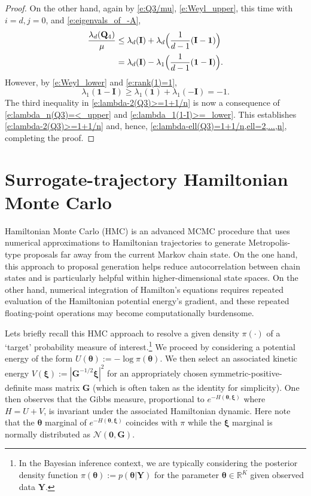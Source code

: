 \documentclass[9pt,twocolumn,twoside]{pnas-new}
\newcommand{\?}{\textbf{?}}
\newcommand{\Y}{\textbf{Y}}
\newcommand{\GD}[1]{#1}
\newcommand{\QQ}{\mathbf{Q}}
\newcommand{\II}{\mathbf{I}}
\newcommand{\Zero}{\boldsymbol{0}}
\newcommand{\ttheta}{\boldsymbol{\theta}}
\newcommand{\mom}{\boldsymbol{\xi}}
\begin{document}
\begin{proof}
On the other hand, again by \eqref{e:Q3/mu}, \eqref{e:Weyl_upper}, this
time with $i = d, j = 0$, and \eqref{e:eigenvals_of_-A},
\begin{align}
  \GD{\frac{\lambda_d(\QQ_4)}{\mu}}
  &\leq \lambda_d(\II)
         + \lambda_d\Big(\frac{1}{d-1}(\II - {\mathbf 1})\Big)
    \notag\\
  &= \lambda_d(\II) - \lambda_1\Big(\frac{1}{d-1}({\mathbf 1}-\II)\Big).
        \label{e:lambda_n(Q3)=<_upper}
\end{align}
However, by \eqref{e:Weyl_lower} and \eqref{e:rank(1)=1},
\begin{equation}\label{e:lambda_1(1-I)>=_lower}
\lambda_1({\mathbf 1}-\II) \geq \lambda_1({\mathbf 1}) + \lambda_1(-\II)= -1.
\end{equation}
The third inequality in \eqref{e:lambda-2(Q3)>=1+1/n} is now a
consequence of \eqref{e:lambda_n(Q3)=<_upper} and
\eqref{e:lambda_1(1-I)>=_lower}. This establishes
\eqref{e:lambda-2(Q3)>=1+1/n} and, hence,
\eqref{e:lambda-ell(Q3)=1+1/n,ell=2,...,n}, completing the proof.
\end{proof}


\section{Surrogate-trajectory Hamiltonian Monte Carlo}
\label{sec:Sur:trad:HMC}

\newcommand{\G}{\mathbf{G}}

Hamiltonian Monte Carlo (HMC) \cite{duane1987hybrid,neal2011mcmc} is
an advanced MCMC procedure that uses numerical approximations to
Hamiltonian trajectories to generate Metropolis-type
\cite{metropolis1953equation} proposals far away from the current
Markov chain state.  On the one hand, this approach to proposal
generation helps reduce autocorrelation between chain states and is
particularly helpful within higher-dimensional state spaces.  On the
other hand, numerical integration of Hamilton's equations requires
repeated evaluation of the Hamiltonian potential energy's gradient,
and these repeated floating-point operations may become
computationally burdensome.

Lets briefly recall this HMC approach to resolve a given density
$\pi(\cdot)$ of a `target' probability measure of
interest.\footnote{In the Bayesian inference context, we are typically
  considering the posterior density function
  $\pi(\ttheta):=p(\ttheta|\Y)$ for the parameter
  $\ttheta\in\mathbb{R}^K$ given observed data $\Y$.}  We proceed by
considering a potential energy of the form
$U(\ttheta):=-\log \pi(\ttheta)$.  We then select an associated
kinetic energy $V(\mom) := | \G^{-1/2} \mom|^2$ for an appropriately
chosen symmetric-positive-definite mass matrix $\G$ (which is often
taken as the identity for simplicity).  One then observes that the
Gibbs measure, proportional to $e^{-H(\ttheta, \mom)}$ where
$H = U +V$, is invariant under the associated Hamiltonian dynamic.
Here note that the $\ttheta$ marginal of $e^{-H(\ttheta, \mom)}$
coincides with $\pi$ while the $\mom$ marginal is normally distributed
as $\mathcal{N}(\Zero,\G)$.
\end{document}
